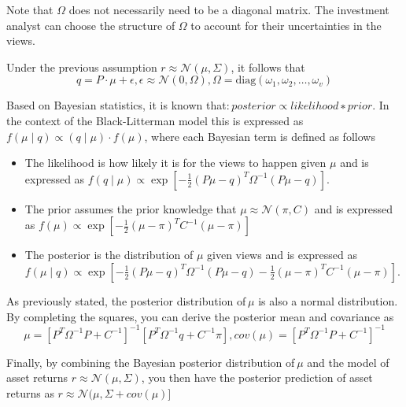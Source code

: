Note that $\Omega$ does not necessarily need to be a diagonal matrix. The investment analyst can choose the structure of $\Omega$ to account for their uncertainties in the views.

Under the previous assumption $r\approx\mathcal{N}(\mu,\Sigma)$, it follows that
\begin{equation}
q = P\cdot \mu + \epsilon,  \epsilon\approx\mathcal{N}(0, \Omega),  \Omega=\text{diag}(\omega_1, \omega_2,\ldots,\omega_v)
\end{equation}

Based on Bayesian statistics, it is known that: $posterior\propto likelihood∗prior$.
In the context of the Black-Litterman model this is expressed as $f(\mu∣q)\propto(q∣\mu)\cdot f(\mu)$, where each Bayesian term is defined as follows
\begin{itemize}
  \item The likelihood is how likely it is for the views to happen given $\mu$ and is expressed as $f(q∣\mu)\propto\exp[−\frac{1}{2}(P\mu-q)^T\Omega^{-1}(P\mu−q)]$.
  \item The prior assumes the prior knowledge that $\mu\approx\mathcal{N}(\pi, C)$ and is expressed as $f(\mu)\propto\exp[−\frac{1}{2}(\mu−\pi)^T C^{-1}(\mu−\pi)]$
  \item The posterior is the distribution of $\mu$ given views and is expressed as $f(\mu∣q)\propto\exp[−\frac{1}{2}(P\mu−q)^T \Omega^{-1}(P\mu−q)−\frac{1}{2}(\mu−\pi)^T C^{-1}(\mu−\pi)]$.
\end{itemize}

As previously stated, the posterior distribution of $\mu$ is also a normal distribution. By completing the squares, you can derive the posterior mean and covariance as
\begin{equation}
  \mu=[P^T\Omega^{-1}P+C^{-1}]^{-1}[P^T\Omega^{-1}q+C^{-1}\pi], cov(\mu)=[P^T\Omega^{-1}P+C^{-1}]^{-1}
\end{equation}

Finally, by combining the Bayesian posterior distribution of $\mu$ and the model of asset returns $r\approx\mathcal{N}(\mu,\Sigma)$, you then have the posterior prediction of asset returns as $r\approx\mathcal{N}(\mu,\Sigma+cov(\mu)]$


